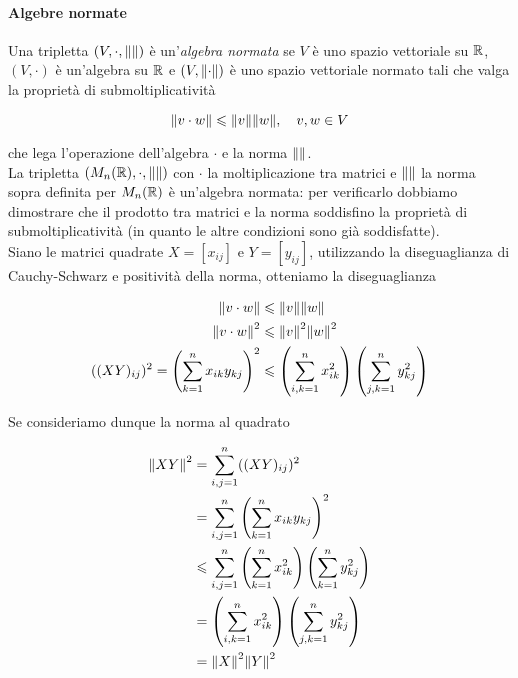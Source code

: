 \paragraph{Algebre normate}

Una tripletta $ (V,\cdot,\norm{}) $ è un'\textit{algebra normata} se $ V $ è uno spazio vettoriale su $ \mathbb{R} $, $ (V,\cdot) $ è un'algebra su $ \mathbb{R} $ e $ (V,\norm{\cdot}) $ è uno spazio vettoriale normato tali che valga la proprietà di submoltiplicatività

\begin{equation}
	\norm{v \cdot w} \leqslant \norm{v} \norm{w} \qcomma v,w \in V
\end{equation}

che lega l'operazione dell'algebra $ \cdot $ e la norma $ \norm{} $.\\
La tripletta $ (M_{n}(\mathbb{R}),\cdot,\norm{}) $ con $ \cdot $ la moltiplicazione tra matrici e $ \norm{} $ la norma sopra definita per $ M_{n}(\mathbb{R}) $ è un'algebra normata: per verificarlo dobbiamo dimostrare che il prodotto tra matrici e la norma soddisfino la proprietà di submoltiplicatività (in quanto le altre condizioni sono già soddisfatte).\\
Siano le matrici quadrate $ X = [x_{ij}] $ e $ Y = [y_{ij}] $, utilizzando la diseguaglianza di Cauchy-Schwarz e positività della norma, otteniamo la diseguaglianza

\begin{align}
	\norm{v \cdot w} &\leqslant \norm{v} \norm{w} \\
	\norm{v \cdot w}^{2} &\leqslant \norm{v}^{2} \norm{w}^{2} \\
	((X Y)_{ij})^{2} = \left( \sum_{k=1}^{n} x_{ik} y_{kj} \right)^{2} &\leqslant \left( \sum_{i,k=1}^{n} x_{ik}^{2} \right) \left( \sum_{j,k=1}^{n} y_{kj}^{2} \right)
\end{align}

Se consideriamo dunque la norma al quadrato

\begin{align}
	\begin{split}
		\norm{X Y}^{2} &= \sum_{i,j=1}^{n} ((X Y)_{ij})^{2}\\
		&= \sum_{i,j=1}^{n} \left( \sum_{k=1}^{n} x_{ik} y_{kj} \right)^{2}\\
		&\leqslant \sum_{i,j=1}^{n} \left( \sum_{k=1}^{n} x_{ik}^{2} \right) \left( \sum_{k=1}^{n} y_{kj}^{2} \right)\\
		&= \left( \sum_{i,k=1}^{n} x_{ik}^{2} \right) \left( \sum_{j,k=1}^{n} y_{kj}^{2} \right)\\
		&= \norm{X}^{2} \norm{Y}^{2}
	\end{split}
\end{align}


